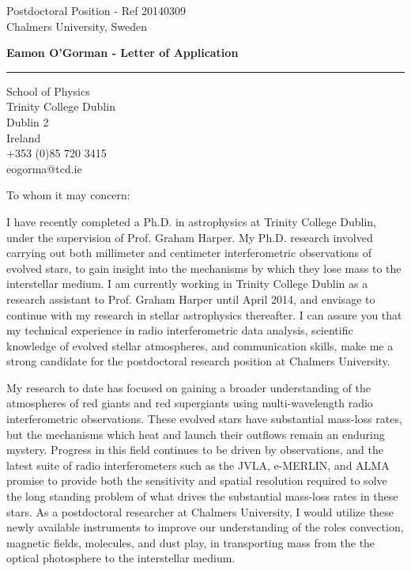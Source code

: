 \documentclass[10pt]{letter} %
\begin{document}
\longindentation=0pt                       %
\let\raggedleft\raggedright                %

\begin{letter}{Postdoctoral Position - Ref 20140309\\
Chalmers University, Sweden
}

\begin{flushleft}
{\large\bf Eamon O'Gorman - Letter of Application}
\end{flushleft}
\medskip\hrule height 1pt
\begin{flushright}
\hfill School of Physics \\
\hfill Trinity College Dublin \\
\hfill Dublin 2 \\
\hfill Ireland \\
\hfill +353 (0)85 720 3415 \\
\hfill eogorma@tcd.ie \\

\end{flushright} 
\vfill %
\vspace{-1.2cm}
\opening{To whom it may concern:} 

 
\noindent I have recently completed a Ph.D. in astrophysics at Trinity College Dublin, under the supervision of Prof. Graham Harper. My Ph.D. research involved carrying out both millimeter and centimeter interferometric observations of evolved stars, to gain insight into the mechanisms by which they lose mass to the interstellar medium. I am currently working in Trinity College Dublin as a research assistant to Prof. Graham Harper until April 2014, and envisage to continue with my research in stellar astrophysics thereafter. I can assure you that my technical experience in radio interferometric data analysis, scientific knowledge of evolved stellar atmospheres, and communication skills, make me a strong candidate for the postdoctoral research position at Chalmers University.

\noindent My research to date has focused on gaining a broader understanding of the atmospheres of red giants and red supergiants using multi-wavelength radio interferometric observations. These evolved stars have substantial mass-loss rates, but the mechanisms which heat and launch their outflows remain an enduring mystery. Progress in this field continues to be driven by observations, and the latest suite of radio interferometers such as the JVLA, e-MERLIN, and ALMA promise to provide both the sensitivity and spatial resolution required to solve the long standing problem of what drives the substantial mass-loss rates in these stars. As a  postdoctoral researcher at Chalmers University, I would utilize these newly available instruments to improve our understanding of the roles convection, magnetic fields, molecules, and dust play, in transporting mass from the  the optical photosphere to the interstellar medium.


\end{letter}
\end{document}
